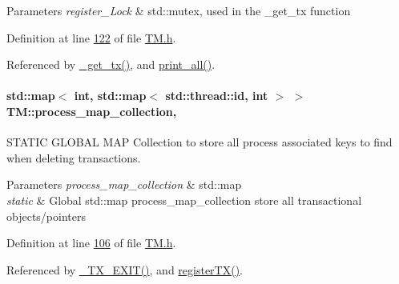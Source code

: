 \begin{DoxyParams}{Parameters}
{\em register\+\_\+\+Lock} & std\+::mutex, used in the \+\_\+get\+\_\+tx function \\
\hline
\end{DoxyParams}


Definition at line \hyperlink{_t_m_8h_source_l00122}{122} of file \hyperlink{_t_m_8h_source}{T\+M.\+h}.



Referenced by \hyperlink{_t_m_8cpp_source_l00078}{\+\_\+get\+\_\+tx()}, and \hyperlink{_t_m_8cpp_source_l00121}{print\+\_\+all()}.

\paragraph[{\texorpdfstring{process\+\_\+map\+\_\+collection}{process_map_collection}}]{\setlength{\rightskip}{0pt plus 5cm}std\+::map$<$ int, std\+::map$<$ std\+::thread\+::id, int $>$ $>$ T\+M\+::process\+\_\+map\+\_\+collection\hspace{0.3cm}{\ttfamily [static]}, {\ttfamily [private]}}\hypertarget{class_t_m_a81c3bd28ad2343a620fa070f8ac186ca_a81c3bd28ad2343a620fa070f8ac186ca}{}\label{class_t_m_a81c3bd28ad2343a620fa070f8ac186ca_a81c3bd28ad2343a620fa070f8ac186ca}


S\+T\+A\+T\+IC G\+L\+O\+B\+AL M\+AP Collection to store all process associated keys to find when deleting transactions. 


\begin{DoxyParams}{Parameters}
{\em process\+\_\+map\+\_\+collection} & std\+::map\\
\hline
{\em static} & Global std\+::map process\+\_\+map\+\_\+collection store all transactional objects/pointers \\
\hline
\end{DoxyParams}


Definition at line \hyperlink{_t_m_8h_source_l00106}{106} of file \hyperlink{_t_m_8h_source}{T\+M.\+h}.



Referenced by \hyperlink{_t_m_8cpp_source_l00101}{\+\_\+\+T\+X\+\_\+\+E\+X\+I\+T()}, and \hyperlink{_t_m_8cpp_source_l00043}{register\+T\+X()}.

